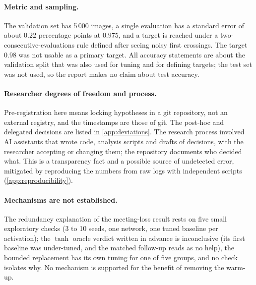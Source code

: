 \paragraph{Metric and sampling.} The validation set has 5\,000 images, a single evaluation has a standard error of about $0.22$ percentage points at $0.975$, and a target is reached under a two-consecutive-evaluations rule defined after seeing noisy first crossings. The target $0.98$ was not usable as a primary target. All accuracy statements are about the validation split that was also used for tuning and for defining targets; the test set was not used, so the report makes no claim about test accuracy.

\paragraph{Researcher degrees of freedom and process.} Pre-registration here means locking hypotheses in a git repository, not an external registry, and the timestamps are those of git. The post-hoc and delegated decisions are listed in \cref{app:deviations}. The research process involved AI assistants that wrote code, analysis scripts and drafts of decisions, with the researcher accepting or changing them; the repository documents who decided what. This is a transparency fact and a possible source of undetected error, mitigated by reproducing the numbers from raw logs with independent scripts (\cref{app:reproducibility}).

\paragraph{Mechanisms are not established.} The redundancy explanation of the meeting-loss result rests on five small exploratory checks (3 to 10 seeds, one network, one tuned baseline per activation); the $\tanh$ oracle verdict written in advance is inconclusive (its first baseline was under-tuned, and the matched follow-up reads as no help), the bounded replacement has its own tuning for one of five groups, and no check isolates why. No mechanism is supported for the benefit of removing the warm-up.

